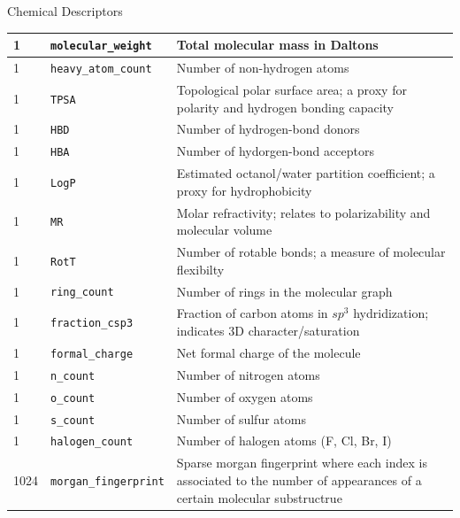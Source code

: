 \begin{frame}[shrink=10]{Chemical Descriptors}
\begin{longtable}{|p{1.5cm}||p{5cm}|p{12.6cm}|}
\hline
1 & \texttt{molecular\_weight} & Total molecular mass in Daltons \\ \hline
1 & \texttt{heavy\_atom\_count} & Number of non-hydrogen atoms \\ \hline
1 & \texttt{TPSA} & Topological polar surface area; a proxy for polarity and hydrogen bonding capacity \\ \hline
1 & \texttt{HBD} & Number of hydrogen-bond donors \\ \hline
1 & \texttt{HBA} & Number of hydorgen-bond acceptors \\ \hline
1 & \texttt{LogP} & Estimated octanol/water partition coefficient; a proxy for hydrophobicity \\ \hline
1 & \texttt{MR} & Molar refractivity; relates to polarizability and molecular volume \\ \hline
1 & \texttt{RotT} & Number of rotable bonds; a measure of molecular flexibilty \\ \hline
1 & \texttt{ring\_count} & Number of rings in the molecular graph \\ \hline
1 & \texttt{fraction\_csp3} & Fraction of carbon atoms in $sp^3$ hydridization; indicates 3D character/saturation\\ \hline
1 & \texttt{formal\_charge} & Net formal charge of the molecule \\ \hline
1 & \texttt{n\_count} & Number of nitrogen atoms \\ \hline
1 & \texttt{o\_count} & Number of oxygen atoms \\ \hline
1 & \texttt{s\_count} & Number of sulfur atoms \\ \hline
1 & \texttt{halogen\_count} & Number of halogen atoms (F, Cl, Br, I) \\ \hline
1024 & \texttt{morgan\_fingerprint} & Sparse morgan fingerprint where each index is associated to the number of appearances of a certain molecular substructrue \\
\hline
\end{longtable}
\label{frame:chemicalDescriptors}
\end{frame}